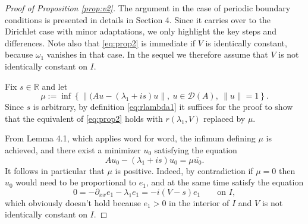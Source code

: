 \documentclass[12pt]{article}
\newcommand{\R}{\mathbb{R}}
\begin{document}
\begin{proof}[Proof of Proposition \ref{prop:v2}]
The argument in the case of periodic boundary conditions is presented in  
details in \cite{Wei21} Section 4. Since it carries over to the Dirichlet case 
with minor adaptations, we only highlight the key steps and differences.
Note also that \eqref{eq:prop2} is immediate if $V$ is identically constant,
because $\omega_1$ vanishes in that case. In the sequel we therefore assume
that $V$ is not identically constant on $I$.

Fix $s \in \R$ and let 
\begin{equation}\label{def:mu}
\mu := \inf\left\{ \|(Au - (\lambda_1 + is) u\|, 
\ u \in \mathcal{D}(A),\ \|u\| = 1\right\}.
\end{equation}
Since $s$ is arbitrary, by definition \eqref{eq:rlambda1} it suffices 
for the proof to show that the equivalent of \eqref{eq:prop2} holds 
with $r(\lambda_1, V)$ replaced by $\mu.$ 

From \cite{Wei21} Lemma 4.1, which applies 
word for word, the infimum defining $\mu$ is achieved, and 
there exist a minimizer $u_0$ satisfying the equation
\begin{equation}\label{eq:minimizer}
   Au_0 -(\lambda_1 + is)u_0 = \mu \bar{u_0}. 
\end{equation}
It follows in particular that $\mu$ is positive. Indeed, by
contradiction if $\mu = 0$ then $u_0$ would need to be proportional to $e_1$, 
and at the same time satisfy the equation
$$
0 = -\partial_{xx} e_1 - \lambda_1 e_1 = -i(V-s)e_1 \qquad\text{on } I,
$$
which obviously doesn't hold because $e_1 >0$ in the interior of $I$ and $V$ is 
not identically constant on $I$. 


\end{proof}
\end{document}
